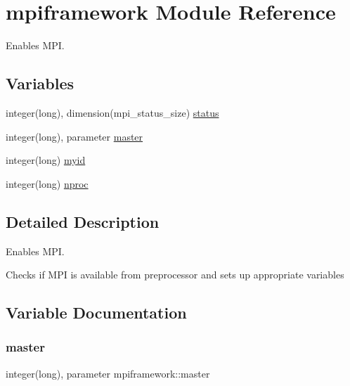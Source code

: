 \hypertarget{namespacempiframework}{}\section{mpiframework Module Reference}
\label{namespacempiframework}


Enables M\+PI.  


\subsection*{Variables}
\begin{DoxyCompactItemize}
\item 
integer(long), dimension(mpi\+\_\+status\+\_\+size) \hyperlink{namespacempiframework_ab7c6b211b6d67a29e8b7e2cefe97d5b2}{status}
\item 
integer(long), parameter \hyperlink{namespacempiframework_ae3cf75bc4150b05cabe037cf7478d4a0}{master}
\item 
integer(long) \hyperlink{namespacempiframework_ae833a6cbdc45698ffa99a650f0e6bb2d}{myid}
\item 
integer(long) \hyperlink{namespacempiframework_af70b38210cb3bcccdc873618ffb3de35}{nproc}
\end{DoxyCompactItemize}


\subsection{Detailed Description}
Enables M\+PI. 

Checks if M\+PI is available from preprocessor and sets up appropriate variables 

\subsection{Variable Documentation}
\mbox{\label{namespacempiframework_ae3cf75bc4150b05cabe037cf7478d4a0}} 
\subsubsection{\texorpdfstring{master}{master}}
{\footnotesize\ttfamily integer(long), parameter mpiframework\+::master}

\mbox{\label{namespacempiframework_ae833a6cbdc45698ffa99a650f0e6bb2d}} 
